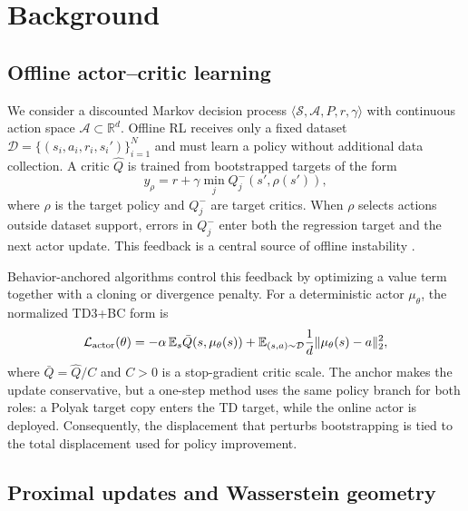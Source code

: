 \section{Background}
\label{sec:background}

\subsection{Offline actor--critic learning}

We consider a discounted Markov decision process
$\langle\mathcal S,\mathcal A,P,r,\gamma\rangle$ with continuous action space
$\mathcal A\subset\mathbb R^d$. Offline RL receives only a fixed dataset
$\mathcal D=\{(s_i,a_i,r_i,s_i')\}_{i=1}^N$ and must learn a policy without
additional data collection. A critic $\widehat Q$ is trained from bootstrapped
targets of the form
\begin{equation}
 y_{\rho}=r+\gamma\min_{j}Q^-_j(s',\rho(s')),
 \label{eq:td_target_background}
\end{equation}
where $\rho$ is the target policy and $Q^-_j$ are target critics. When $\rho$
selects actions outside dataset support, errors in $Q^-_j$ enter both the
regression target and the next actor update. This feedback is a central source
of offline instability \citep{fujimoto2019offpolicy,kumar2019bear}.

Behavior-anchored algorithms control this feedback by optimizing a value term
together with a cloning or divergence penalty. For a deterministic actor
$\mu_\theta$, the normalized TD3+BC form is
\begin{equation}
 \mathcal L_{\rm actor}(\theta)
 =-\alpha\,\mathbb E_s\bar Q(s,\mu_\theta(s))
 +\mathbb E_{(s,a)\sim\mathcal D}\frac{1}{d}
   \|\mu_\theta(s)-a\|_2^2,
 \label{eq:td3bc_background}
\end{equation}
where $\bar Q=\widehat Q/C$ and $C>0$ is a stop-gradient critic scale. The
anchor makes the update conservative, but a one-step method uses the same
policy branch for both roles: a Polyak target copy enters the TD target, while
the online actor is deployed. Consequently, the displacement that perturbs
bootstrapping is tied to the total displacement used for policy improvement.

\subsection{Proximal updates and Wasserstein geometry}

